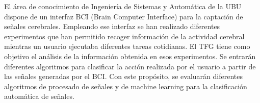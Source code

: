 
El área de conocimiento de Ingeniería de Sistemas y Automática de la UBU dispone de un interfaz BCI (Brain Computer Interface) para la captación de señales cerebrales. Empleando ese interfaz se han realizado diferentes experimentos que han permitido recoger información de la actividad cerebral mientras un usuario ejecutaba diferentes tareas cotidianas. El TFG tiene como objetivo el análisis de la información obtenida en esos experimentos. Se entrarán diferentes algoritmos para clasificar la acción realizada por el usuario a partir de las señales generadas por el BCI. Con este propósito, se evaluarán diferentes algoritmos de procesado de señales y de machine learning para la clasificación automática de señales.


